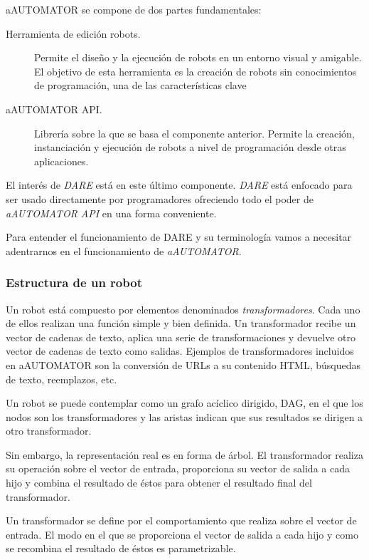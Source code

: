 aAUTOMATOR se compone de dos partes fundamentales:
\begin{description}
\item[Herramienta de edición robots.] Permite el diseño y la ejecución
  de robots en un entorno visual y amigable. El objetivo de esta
  herramienta es la creación de robots sin conocimientos de
  programación, una de las características clave

\item[aAUTOMATOR API.] Librería sobre la que se basa el componente
  anterior. Permite la creación, instanciación y ejecución de robots a
  nivel de programación desde otras aplicaciones.
\end{description}

El interés de \emph{DARE} está en este último componente. \emph{DARE} está
enfocado para ser usado directamente por programadores ofreciendo todo
el poder de \emph{aAUTOMATOR API} en una forma conveniente.

Para entender el funcionamiento de DARE y su terminología vamos a
necesitar adentrarnos en el funcionamiento de \emph{aAUTOMATOR}.

\subsubsection{Estructura de un robot}
\label{COMPORTAMIENTO_AUTOMATOR}

Un robot está compuesto por elementos denominados
\emph{transformadores}. Cada uno de ellos realizan una función simple y bien
definida. Un transformador recibe un vector de cadenas de texto,
aplica una serie de transformaciones y devuelve otro vector de cadenas
de texto como salidas. Ejemplos de transformadores incluidos en
aAUTOMATOR son la conversión de URLs a su contenido HTML, búsquedas de
texto, reemplazos, etc.

Un robot se puede contemplar como un grafo acíclico dirigido,
DAG\cite{DAG}, en el que los nodos son los transformadores y las
aristas indican que sus resultados se dirigen a otro transformador.

Sin embargo, la representación real es en forma de árbol. El
transformador realiza su operación sobre el vector de entrada,
proporciona su vector de salida a cada hijo y combina el resultado de
éstos para obtener el resultado final del transformador.


Un transformador se define por el comportamiento que realiza sobre el
vector de entrada. El modo en el que se proporciona el vector de
salida a cada hijo y como se recombina el resultado de éstos es
parametrizable.


